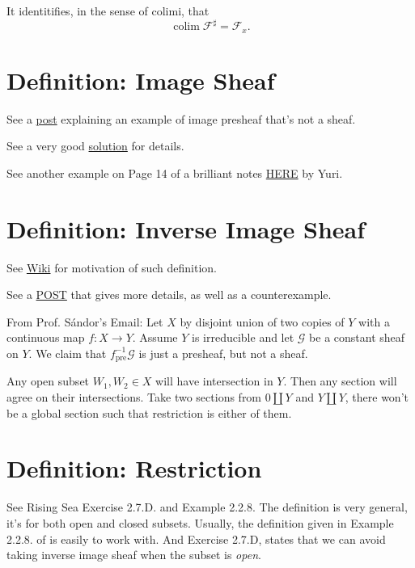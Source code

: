 It identitifies, in the sense of colimi, that
\[\operatorname{colim}\mathscr F^{\sharp}=\mathscr F_x.\]
  
\section{Definition: Image Sheaf}

See a \href{https://math.stackexchange.com/questions/3838804/image-presheaf-which-is-not-a-sheaf}{post} explaining an example of image presheaf that's not a sheaf.

See a very good \href{https://www2.math.ethz.ch/education/bachelor/lectures/fs2016/math/alg_geom/Solution12.pdf}{solution} for details.

See another example on Page 14 of a brilliant notes \href{https://pi.math.cornell.edu/~apatotski/7400-notes.pdf}{HERE} by Yuri.

\section{Definition: Inverse Image Sheaf}

See \href{https://en.wikipedia.org/wiki/Inverse_image_functor}{Wiki} for motivation of such definition.

See a \href{https://en.wikipedia.org/wiki/Inverse_image_functor}{POST} that gives more details, as well as a counterexample.

From Prof. S\'andor's Email: Let $X$ by disjoint union of two copies of $Y$ with a continuous map $f:X\to Y$. Assume $Y$ is irreducible and let $\mathscr G$ be a constant sheaf on $Y$. We claim that $f^{-1}_{\text{pre}} \mathscr G$ is just a presheaf, but not a sheaf. 

Any open subset $W_1, W_2\in X$ will have intersection in $Y$. Then any section will agree on their intersections. Take two sections from $0\amalg Y$ and $Y\amalg Y$, there won't be a global section such that restriction is either of them.

\section{Definition: Restriction}

See Rising Sea \cite{RaviRisingSea} Exercise 2.7.D.  and Example 2.2.8. The definition is very general, it's for both open and closed subsets. Usually, the definition given in Example 2.2.8. of \cite{RaviRisingSea} is easily to work with. And Exercise 2.7.D, states that we can avoid taking inverse image sheaf when the subset is \textit{open}.

